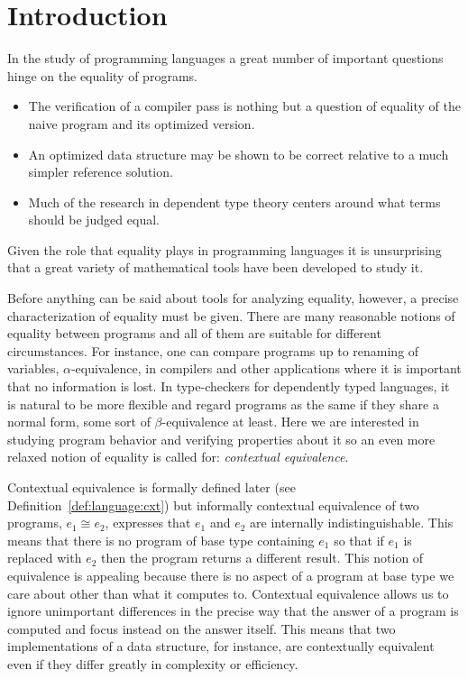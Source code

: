 \section{Introduction}\label{sec:introduction}

In the study of programming languages a great number of important
questions hinge on the equality of programs.
\begin{itemize}
\item The verification of a compiler pass is nothing but a
  question of equality of the naive program and its optimized
  version.
\item An optimized data structure may be shown to be correct relative to a
  much simpler reference solution.
\item Much of the research in dependent type theory centers around
  what terms should be judged equal.
\end{itemize}
Given the role that equality plays in programming languages it is
unsurprising that a great variety of mathematical tools have been
developed to study it.

Before anything can be said about tools for analyzing equality,
however, a precise characterization of equality must be given. There
are many reasonable notions of equality between programs and all of
them are suitable for different circumstances. For instance, one can
compare programs up to renaming of variables, $\alpha$-equivalence, in
compilers and other applications where it is important that no
information is lost. In type-checkers for dependently typed languages,
it is natural to be more flexible and regard programs as the same if
they share a normal form, some sort of $\beta$-equivalence at
least. Here we are interested in studying program behavior
and verifying properties about it so an even more relaxed notion of
equality is called for: \emph{contextual equivalence}.

Contextual equivalence is formally defined later (see
Definition~\ref{def:language:cxt}) but informally contextual
equivalence of two programs, $e_1 \cong e_2$, expresses that $e_1$ and
$e_2$ are internally indistinguishable. This means that there is no
program of base type containing $e_1$ so that if $e_1$ is replaced
with $e_2$ then the program returns a different result. This notion of
equivalence is appealing because there is no aspect of a program at
base type we care about other than what it computes to. Contextual
equivalence allows us to ignore unimportant differences in the precise
way that the answer of a program is computed and focus instead on the
answer itself. This means that two implementations of a data
structure, for instance, are contextually equivalent even if they
differ greatly in complexity or efficiency.

